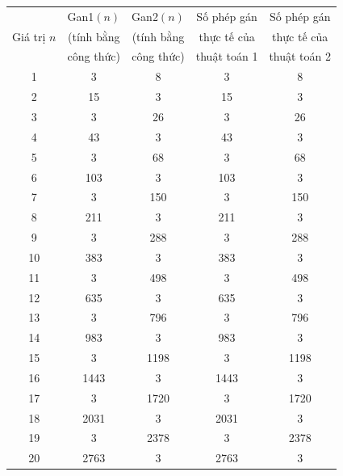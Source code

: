 \documentclass[12pt, a4paper, fleqn]{article}
\begin{document}
	\begin{center}
		\begin{tabular}{ | c | c | c | c | c | }
			
			\hline
			& Gan1$(n)$ & Gan2$(n)$ & Số phép gán & Số phép gán \\
			Giá trị $n$ & (tính bằng & (tính bằng & thực tế của & thực tế của \\
			& công thức) & công thức) & thuật toán 1 & thuật toán 2 \\
			\hline
			
			\hline
			1 & 3 & 8 & 3 & 8 \\
			\hline
			
			\hline
			2 & 15 & 3 & 15 & 3 \\
			\hline
			
			\hline
			3 & 3 & 26 & 3 & 26 \\
			\hline
			
			\hline
			4 & 43 & 3 & 43 & 3 \\
			\hline
			
			\hline
			5 & 3 & 68 & 3 & 68 \\
			\hline
			
			\hline
			6 & 103 & 3 & 103 & 3 \\
			\hline
			
			\hline
			7 & 3 & 150 & 3 & 150 \\
			\hline
			
			\hline
			8 & 211 & 3 & 211 & 3 \\
			\hline
			
			\hline
			9 & 3 & 288 & 3 & 288 \\
			\hline
			
			\hline
			10 & 383 & 3 & 383 & 3 \\
			\hline
			
			\hline
			11 & 3 & 498 & 3 & 498 \\
			\hline
			
			\hline
			12 & 635 & 3 & 635 & 3 \\
			\hline
			
			\hline
			13 & 3 & 796 & 3 & 796 \\
			\hline
			
			\hline
			14 & 983 & 3 & 983 & 3 \\
			\hline
			
			\hline
			15 & 3 & 1198 & 3 & 1198 \\
			\hline
			
			\hline
			16 & 1443 & 3 & 1443 & 3 \\
			\hline
			
			\hline
			17 & 3 & 1720 & 3 & 1720 \\
			\hline
			
			\hline
			18 & 2031 & 3 & 2031 & 3 \\
			\hline
			
			\hline
			19 & 3 & 2378 & 3 & 2378 \\
			\hline
			
			\hline
			20 & 2763 & 3 & 2763 & 3 \\
			\hline
		\end{tabular}
	\end{center}
\end{document}
